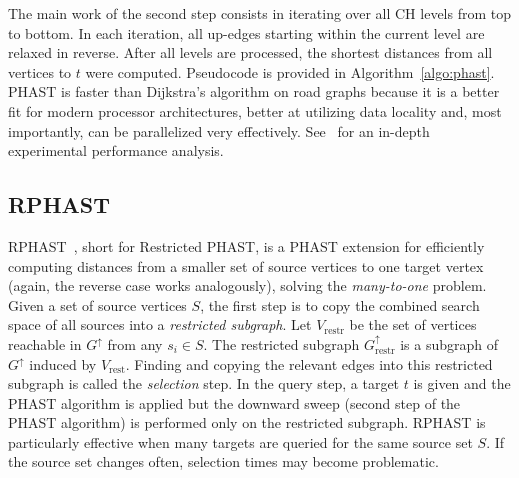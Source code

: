 \documentclass[manuscript,review]{acmart}
\newcommand*{\gchu}{G^{\uparrow}}
\begin{document}
The main work of the second step consists in iterating over all CH levels from top to bottom.
In each iteration, all up-edges starting within the current level are relaxed in reverse.
After all levels are processed, the shortest distances from all vertices to $t$ were computed.
Pseudocode is provided in Algorithm~\ref{algo:phast}.
PHAST is faster than Dijkstra's algorithm on road graphs because it is a better fit for modern processor architectures, better at utilizing data locality and, most importantly, can be parallelized very effectively.
See~\cite{dgnw-phast-13} for an in-depth experimental performance analysis.


\subsection{RPHAST}

RPHAST~\cite{delling_et_al:OASIcs:2011:3266}, short for Restricted PHAST, is a PHAST extension for efficiently computing distances from a smaller set of source vertices to one target vertex (again, the reverse case works analogously), solving the \emph{many-to-one} problem.
Given a set of source vertices $S$, the first step is to copy the combined search space of all sources into a \emph{restricted subgraph}.
Let $V_{\operatorname{restr}}$ be the set of vertices reachable in $\gchu$ from any $s_i \in S$.
The restricted subgraph $\gchu_{\operatorname{restr}}$ is a subgraph of $\gchu$ induced by $V_{\operatorname{rest}}$.
Finding and copying the relevant edges into this restricted subgraph is called the \emph{selection} step.
In the query step, a target $t$ is given and the PHAST algorithm is applied but the downward sweep (second step of the PHAST algorithm) is performed only on the restricted subgraph.
RPHAST is particularly effective when many targets are queried for the same source set $S$.
If the source set changes often, selection times may become problematic.
\end{document}
